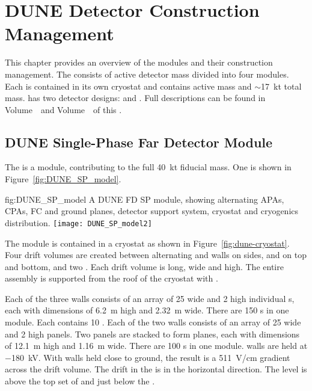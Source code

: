 \chapter{DUNE Detector Construction Management}
\label{vl:tc-dune_overview}


This chapter provides an overview of
the   modules and their construction
management. The  consists of \fdfiducialmass active 
detector mass divided into four modules. Each  is contained in
its own cryostat and contains \nominalmodsize active mass and
$\sim$\SI{17}{\kilo\tonne} total mass.  has two detector designs:
 and .  Full descriptions can be found in
 Volume~\volnumbersp\ and  Volume~\volnumberdp\
of this  .

\section{DUNE Single-Phase Far Detector Module}
\label{sec:fdsp-SP-module}

The   is a \nominalmodsize module,
contributing to the full \SI{40}{\kilo\tonne}  fiducial
mass.  One \nominalmodsize \dword{spmod} is shown in
Figure~\ref{fig:DUNE_SP_model}.
\begin{dunefigure}
{fig:DUNE_SP_model} 
{A \nominalmodsize DUNE FD SP module, showing alternating APAs,
    CPAs, FC and ground planes, detector support system, cryostat
    and cryogenics distribution.}
  \texttt{[image: DUNE\_SP\_model2]}
\end{dunefigure} 

The module is contained in a cryostat as shown in
Figure~\ref{fig:dune-cryostat}.  Four drift volumes are created
between alternating  and  walls on sides,
 and  on top and bottom, and two .
Each drift volume is \sptpclen long, \spmaxdrift wide and \tpcheight
high.  The entire assembly is supported from the roof of the cryostat
with \dword{dss}.

Each of the three  walls consists of an array of \num{25}
wide and \num{2} high individual s, each with dimensions of
\SI{6.2}{\meter} high and \SI{2.32}{\meter} wide. There are \num{150}
s in one module. Each \dword{apa} contains \num{10}
. Each of the two  walls consists of an array of
\num{25} wide and \num{2} high \dword{cpa} panels. Two panels are
stacked to form planes, each with dimensions of \SI{12.1}{\meter} high
and \SI{1.16}{\meter} wide. There are \num{100} s in one
module.  \dword{cpa} walls are held at $-$\SI{180}{\kilo\volt}. With
\dword{apa} walls held close to ground, the result is a
\SI{511}{\volt/\centi\meter} gradient across the drift volume. The
drift in the \dword{spmod} is in the horizontal direction. The
 level is above the top set of  and just below
the \dword{dss}.

